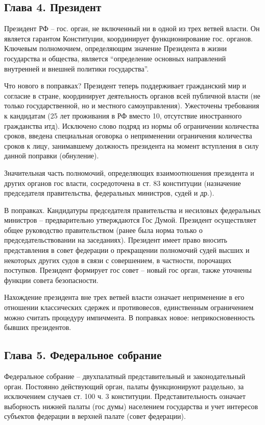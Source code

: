 \documentclass[a4paper, 12pt]{article}
\begin{document}
\subsection{Глава 4. Президент}
Президент РФ -- гос. орган, не включенный ни в одной из трех ветвей власти. Он является гарантом Конституции, координирует функционирование гос. органов. Ключевым полномочием, определяющим значение Президента в жизни государства и общества, является ``определение основных направлений внутренней и внешней политики государства''. 

Что нового в поправках? 
Президент теперь поддерживает гражданский мир и согласие в стране, координирует деятельность органов всей публичной власти (не только государственной, но и местного самоуправления). 
Ужесточены требования к кандидатам (25 лет проживания в РФ вместо 10, отсутствие иностранного гражданства итд). 
Исключено слово подряд из нормы об ограничении количества сроков, введена специальная оговорка о неприменении ограничения количества сроков к лицу, занимавшему должность президента на момент вступления в силу данной поправки (обнуление). 

Значительная часть полномочий, определяющих взаимоотношения президента и других органов гос власти, сосредоточена в ст. 83 конституции (назначение председателя правительства, федеральных министров, судей и др.). 

В поправках. Кандидатуры председателя правительства и несиловых федеральных министров -- предварительно утверждаются Гос Думой. 
Президент осуществляет общее руководство правительством (ранее была норма только о председательствовании на заседаниях). 
Президент имеет право вносить представления в совет федерации о прекращении полномочий судей высших и некоторых других судов в связи с совершением, в частности, порочащих поступков. 
Президент формирует гос совет -- новый гос орган, также уточнены функции совета безопасности. 

Нахождение президента вне трех ветвей власти означает неприменение в его отношении классических сдержек и противовесов, единственным ограничением можно считать процедуру импичмента. В поправках новое: неприкосновенность бывших президентов. 

\subsection{Глава 5. Федеральное собрание}
Федеральное собрание -- двухпалатный представительный и законодательный орган. Постоянно действующий орган, палаты функционируют раздельно, за исключением случаев ст. 100 ч. 3 конституции. Представительность означает выборность нижней палаты (гос думы) населением государства и учет интересов субъектов федерации в верхней палате (совет федерации). 
\end{document}
